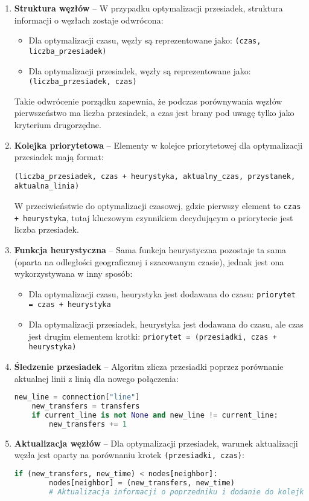 \documentclass[12pt,a4paper]{article}
\begin{document}
\begin{enumerate}
    \item \textbf{Struktura węzłów} -- W przypadku optymalizacji przesiadek, struktura informacji o węzłach zostaje odwrócona:
    \begin{itemize}
        \item Dla optymalizacji czasu, węzły są reprezentowane jako: \texttt{(czas, liczba\_przesiadek)}
        \item Dla optymalizacji przesiadek, węzły są reprezentowane jako: \texttt{(liczba\_przesiadek, czas)}
    \end{itemize}
    Takie odwrócenie porządku zapewnia, że podczas porównywania węzłów pierwszeństwo ma liczba przesiadek, a czas jest brany pod uwagę tylko jako kryterium drugorzędne.
    
    \item \textbf{Kolejka priorytetowa} -- Elementy w kolejce priorytetowej dla optymalizacji przesiadek mają format:
    \begin{center}
        \texttt{(liczba\_przesiadek, czas + heurystyka, aktualny\_czas, przystanek, aktualna\_linia)}
    \end{center}
    W przeciwieństwie do optymalizacji czasowej, gdzie pierwszy element to \texttt{czas + heurystyka}, tutaj kluczowym czynnikiem decydującym o priorytecie jest liczba przesiadek.
    
    \item \textbf{Funkcja heurystyczna} -- Sama funkcja heurystyczna pozostaje ta sama (oparta na odległości geograficznej i szacowanym czasie), jednak jest ona wykorzystywana w inny sposób:
    \begin{itemize}
        \item Dla optymalizacji czasu, heurystyka jest dodawana do czasu: \texttt{priorytet = czas + heurystyka}
        \item Dla optymalizacji przesiadek, heurystyka jest dodawana do czasu, ale czas jest drugim elementem krotki: \texttt{priorytet = (przesiadki, czas + heurystyka)}
    \end{itemize}
    
    \item \textbf{Śledzenie przesiadek} -- Algoritm zlicza przesiadki poprzez porównanie aktualnej linii z linią dla nowego połączenia:
    \begin{lstlisting}[language=Python]
    new_line = connection["line"]
    new_transfers = transfers
    if current_line is not None and new_line != current_line:
        new_transfers += 1
    \end{lstlisting}
    
    \item \textbf{Aktualizacja węzłów} -- Dla optymalizacji przesiadek, warunek aktualizacji węzła jest oparty na porównaniu krotek \texttt{(przesiadki, czas)}:
    \begin{lstlisting}[language=Python]
    if (new_transfers, new_time) < nodes[neighbor]:
        nodes[neighbor] = (new_transfers, new_time)
        # Aktualizacja informacji o poprzedniku i dodanie do kolejki...
    \end{lstlisting}
\end{enumerate}
\end{document}
